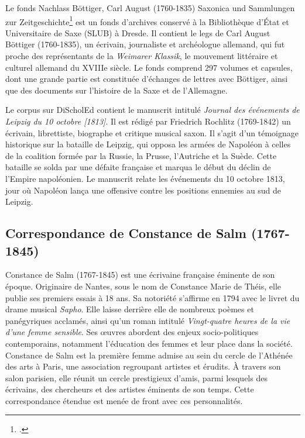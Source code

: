 Le fonds \og{}Nachlass Böttiger, Carl August (1760-1835) Saxonica und Sammlungen zur Zeitgeschichte\fg{}\footcite{bottigerNachlassBottigerCarl00} est un fonds d’archives conservé à la Bibliothèque d’État et Universitaire de Saxe (SLUB) à Dresde. Il contient le legs de Carl August Böttiger (1760-1835), un écrivain, journaliste et archéologue allemand, qui fut proche des représentants de la \textit{Weimarer Klassik}, le mouvement littéraire et culturel allemand du XVIIIe siècle. Le fonds comprend 297 volumes et capsules, dont une grande partie est constituée d'échanges de lettres avec Böttiger, ainsi que des documents sur l’histoire de la Saxe et de l’Allemagne.
    
Le corpus sur DiScholEd contient le manuscrit intitulé \og{}\textit{Journal des événements de Leipzig du 10 octobre [1813]}\fg{}. Il est rédigé par Friedrich Rochlitz (1769-1842) un écrivain, librettiste, biographe et critique musical saxon. Il s'agit d'un témoignage historique sur la bataille de Leipzig, qui opposa les armées de Napoléon à celles de la coalition formée par la Russie, la Prusse, l’Autriche et la Suède. Cette bataille se solda par une défaite française et marqua le début du déclin de l’Empire napoléonien. Le manuscrit relate les événements du 10 octobre 1813, jour où Napoléon lança une offensive contre les positions ennemies au sud de Leipzig.
    
\subsection{Correspondance de Constance de Salm (1767-1845)}

Constance de Salm (1767-1845) est une écrivaine française éminente de son époque. Originaire de Nantes, sous le nom de Constance Marie de Théis, elle publie ses premiers essais à 18 ans. Sa notoriété s'affirme en 1794 avec le livret du drame musical \og{}\textit{Sapho}\fg{}. Elle laisse derrière elle de nombreux poèmes et panégyriques acclamés, ainsi qu'un roman intitulé \og{}\textit{Vingt-quatre heures de la vie d'une femme sensible}\fg{}. Ses œuvres abordent des enjeux socio-politiques contemporains, notamment l'éducation des femmes et leur place dans la société. Constance de Salm est la première femme admise au sein du cercle de l'Athénée des arts à Paris, une association regroupant artistes et érudits. À travers son salon parisien, elle réunit un cercle prestigieux d'amis, parmi lesquels des écrivains, des chercheurs et des artistes éminents de son temps. Cette correspondance étendue est menée de front avec ces personnalités.

